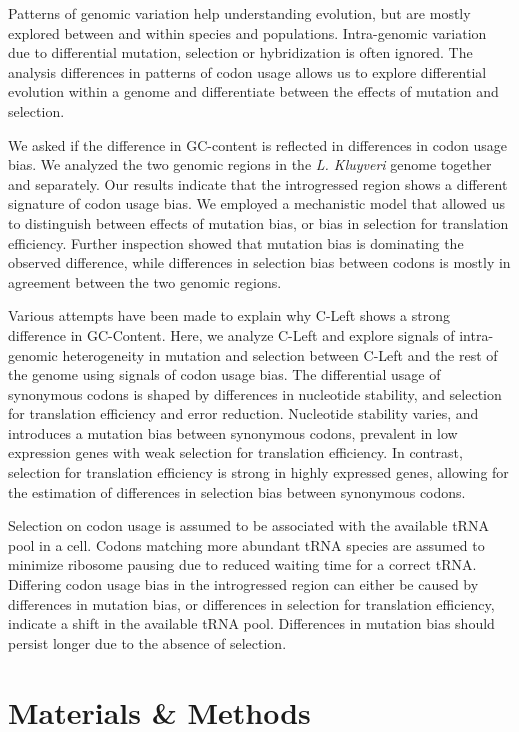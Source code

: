 \documentclass[letter,12pt]{article}
\begin{document}
Patterns of genomic variation help understanding evolution, but are mostly explored between and within species and populations.
Intra-genomic variation due to differential mutation, selection or hybridization is often ignored.
The analysis differences in patterns of codon usage allows us to explore differential evolution within a genome and differentiate between the effects of mutation and selection.

We asked if the difference in GC-content is reflected in differences in codon usage bias.
We analyzed the two genomic regions in the \textit{L. Kluyveri} genome together and separately.
Our results indicate that the introgressed region shows a different signature of codon usage bias.
We employed a mechanistic model that allowed us to distinguish between effects of mutation bias, or bias in selection for translation efficiency.
Further inspection showed that mutation bias is dominating the observed difference, while differences in selection bias between codons is mostly in agreement between the two genomic regions. 

Various attempts have been made to explain why C-Left shows a strong difference in GC-Content.
Here, we analyze C-Left and explore signals of intra-genomic heterogeneity in mutation and selection between C-Left and the rest of the genome using signals of codon usage bias.
The differential usage of synonymous codons is shaped by differences in nucleotide stability, and selection for translation efficiency and error reduction.
Nucleotide stability varies, and introduces a mutation bias between synonymous codons, prevalent in low expression genes with weak selection for translation efficiency.
In contrast, selection for translation efficiency is strong in highly expressed genes, allowing for the estimation of differences in selection bias between synonymous codons.

Selection on codon usage is assumed to be associated with the available tRNA pool in a cell. 
Codons matching more abundant tRNA species are assumed to minimize ribosome pausing due to reduced waiting time for a correct tRNA. 
Differing codon usage bias in the introgressed region can either be caused by differences in mutation bias, or differences in selection for translation efficiency, indicate a shift in the available tRNA pool.
Differences in mutation bias should persist longer due to the absence of selection.   

	
\section{Materials \& Methods}
\end{document}
